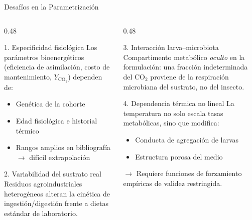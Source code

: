 \documentclass[aspectratio=169, 11pt]{beamer}
\begin{document}
\begin{frame}{Desafíos en la Parametrización}
\begin{columns}[T]
\begin{column}{0.48\textwidth}
\begin{alertblock}{1. Especificidad fisiológica}
Los parámetros bioenergéticos (eficiencia de asimilación, costo de mantenimiento, $Y_{\text{CO}_2}$) dependen de:
\begin{itemize}
    \item Genética de la cohorte
    \item Edad fisiológica e historial térmico
    \item Rangos amplios en bibliografía $\rightarrow$ difícil extrapolación
\end{itemize}
\end{alertblock}
\vspace{0.2cm}
\begin{block}{2. Variabilidad del sustrato real}
Residuos agroindustriales heterogéneos alteran la cinética de ingestión/digestión frente a dietas estándar de laboratorio.
\end{block}
\end{column}
\begin{column}{0.48\textwidth}
\begin{alertblock}{3. Interacción larva--microbiota}
Compartimento metabólico \textit{oculto} en la formulación: una fracción indeterminada del CO$_2$ proviene de la respiración microbiana del sustrato, no del insecto.
\end{alertblock}
\vspace{0.2cm}
\begin{block}{4. Dependencia térmica no lineal}
La temperatura no solo escala tasas metabólicas, sino que modifica:
\begin{itemize}
    \item Conducta de agregación de larvas
    \item Estructura porosa del medio
\end{itemize}
$\rightarrow$ Requiere funciones de forzamiento empíricas de validez restringida.
\end{block}
\end{column}
\end{columns}
\end{frame}
\end{document}
